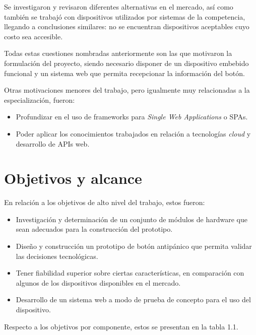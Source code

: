Se investigaron y revisaron diferentes alternativas en el mercado, así como también se trabajó con dispositivos utilizados por sistemas de la competencia, llegando a conclusiones similares: no se encuentran dispositivos aceptables cuyo costo sea accesible.

Todas estas cuestiones nombradas anteriormente son las que motivaron la formulación del proyecto, siendo necesario disponer de un dispositivo embebido funcional y un sistema web que permita recepcionar la información del botón.

Otras motivaciones menores del trabajo, pero igualmente muy relacionadas a la especialización, fueron:
\begin{itemize}
\item Profundizar en el uso de frameworks para \textit{Single Web Applications} o SPAs.
\item Poder aplicar los conocimientos trabajados en relación a tecnologías \textit{cloud} y desarrollo de APIs web.
\end{itemize}


\section{Objetivos y alcance}

En relación a los objetivos de alto nivel del trabajo, estos fueron:
\begin{itemize}
\item Investigación y determinación de un conjunto de módulos de hardware que sean adecuados para la construcción del prototipo.
\item Diseño y construcción un prototipo de botón antipánico que permita validar las decisiones tecnológicas.
\item Tener fiabilidad superior sobre ciertas características, en comparación con algunos de los dispositivos disponibles en el mercado.
\item Desarrollo de un sistema web a modo de prueba de concepto para el uso del dispositivo.
\end{itemize}

Respecto a los objetivos por componente, estos se presentan en la tabla 1.1.

